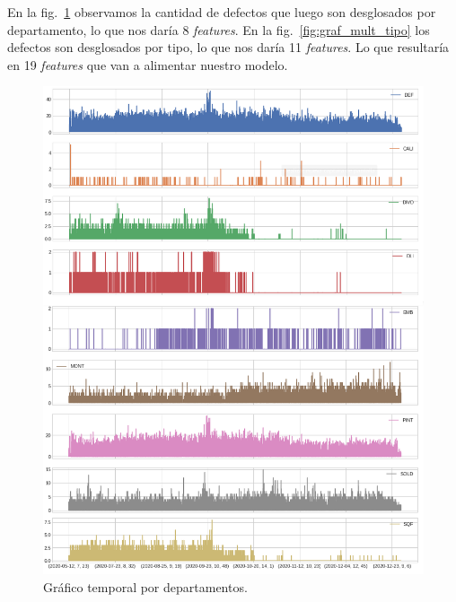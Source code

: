 \documentclass[a4paper,12pt]{article}
\begin{document}
		En la fig.~\ref{fig:graf_mult_dpto} observamos la cantidad de defectos que luego son desglosados por departamento, lo que nos daría 8 \textit{features}. En la fig.~\ref{fig:graf_mult_tipo} los defectos son desglosados por tipo, lo que nos daría 11 \textit{features}. Lo que resultaría en 19 \textit{features} que van a alimentar nuestro modelo.
		
		\begin{figure}[H]
			\begin{center}
				\includegraphics[width=1\textwidth]{multi_dpto.png}
				\caption{Gráfico temporal por departamentos.}
				\label{fig:graf_mult_dpto}
			\end{center}
		\end{figure}
		
\end{document}
